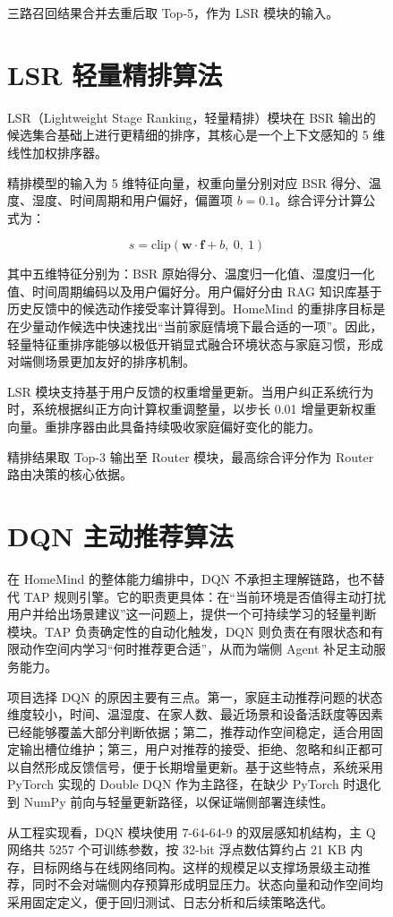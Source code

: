 \documentclass[12pt,a4paper,oneside]{ctexrep}
\begin{document}
\begin{figure}[H]
三路召回结果合并去重后取 Top-5，作为 LSR 模块的输入。

\section{LSR 轻量精排算法}

LSR（Lightweight Stage Ranking，轻量精排）模块在 BSR 输出的候选集合基础上进行更精细的排序，其核心是一个上下文感知的 5 维线性加权排序器。

精排模型的输入为 5 维特征向量，权重向量分别对应 BSR 得分、温度、湿度、时间周期和用户偏好，偏置项 $b = 0.1$。综合评分计算公式为：

\[
s = \text{clip}\left(\mathbf{w} \cdot \mathbf{f} + b,\ 0,\ 1\right)
\]

其中五维特征分别为：BSR 原始得分、温度归一化值、湿度归一化值、时间周期编码以及用户偏好分。用户偏好分由 RAG 知识库基于历史反馈中的候选动作接受率计算得到。HomeMind 的重排序目标是在少量动作候选中快速找出“当前家庭情境下最合适的一项”。因此，轻量特征重排序能够以极低开销显式融合环境状态与家庭习惯，形成对端侧场景更加友好的排序机制。

LSR 模块支持基于用户反馈的权重增量更新。当用户纠正系统行为时，系统根据纠正方向计算权重调整量，以步长 0.01 增量更新权重向量。重排序器由此具备持续吸收家庭偏好变化的能力。

精排结果取 Top-3 输出至 Router 模块，最高综合评分作为 Router 路由决策的核心依据。

\section{DQN 主动推荐算法}

在 HomeMind 的整体能力编排中，DQN 不承担主理解链路，也不替代 TAP 规则引擎。它的职责更具体：在“当前环境是否值得主动打扰用户并给出场景建议”这一问题上，提供一个可持续学习的轻量判断模块。TAP 负责确定性的自动化触发，DQN 则负责在有限状态和有限动作空间内学习“何时推荐更合适”，从而为端侧 Agent 补足主动服务能力。

项目选择 DQN 的原因主要有三点。第一，家庭主动推荐问题的状态维度较小，时间、温湿度、在家人数、最近场景和设备活跃度等因素已经能够覆盖大部分判断依据；第二，推荐动作空间稳定，适合用固定输出槽位维护；第三，用户对推荐的接受、拒绝、忽略和纠正都可以自然形成反馈信号，便于长期增量更新。基于这些特点，系统采用 PyTorch 实现的 Double DQN 作为主路径，在缺少 PyTorch 时退化到 NumPy 前向与轻量更新路径，以保证端侧部署连续性。

从工程实现看，DQN 模块使用 7-64-64-9 的双层感知机结构，主 Q 网络共 5257 个可训练参数，按 32-bit 浮点数估算约占 21 KB 内存，目标网络与在线网络同构。这样的规模足以支撑场景级主动推荐，同时不会对端侧内存预算形成明显压力。状态向量和动作空间均采用固定定义，便于回归测试、日志分析和后续策略迭代。


\end{figure}
\end{document}
